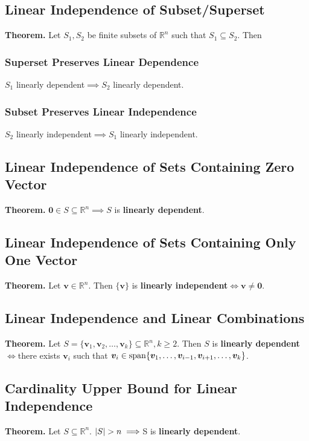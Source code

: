 \documentclass[../ma2001_notes.tex]{subfiles}
\begin{document}
\subsection{Linear Independence of Subset/Superset}
\textbf{Theorem.} Let \(S_1,S_2\) be finite subsets of \(\mathbb{R}^n\) such that \(S_1\subseteq S_2\). Then

\subsubsection{Superset Preserves Linear Dependence}
\(S_1\) linearly dependent\(\implies\)\(S_2\) linearly dependent.

\subsubsection{Subset Preserves Linear Independence}
\(S_2\) linearly independent\(\implies\)\(S_1\) linearly independent.

\subsection{Linear Independence of Sets Containing Zero Vector}
\textbf{Theorem.} \(\bm{0}\in S\subseteq\mathbb{R}^n\implies S\) is \textbf{linearly dependent}.

\subsection{Linear Independence of Sets Containing Only One Vector}
\textbf{Theorem.} Let \(\bm{v}\in\mathbb{R}^n\). Then \(\{\bm{v}\}\) is \textbf{linearly independent}\(\iff\bm{v}\ne\bm{0}\).

\subsection{Linear Independence and Linear Combinations}
\textbf{Theorem.} Let \(S=\{\bm{v}_1,\bm{v}_2,\ldots,\bm{v}_k\}\subseteq\mathbb{R}^n,k\geq2\). Then \(S\) is \textbf{linearly dependent}\(\iff\)there exists \(\bm{v}_i\) such that \(\bm{v}_i\in\operatorname{span}\{\bm{v}_1,\ldots,\bm{v}_{i-1},\bm{v}_{i+1},\ldots,\bm{v}_k\}\).

\subsection{Cardinality Upper Bound for Linear Independence}
\textbf{Theorem.} Let \(S\subseteq\mathbb{R}^n\). \(\lvert S\rvert>n\implies\)S is \textbf{linearly dependent}.
\end{document}
